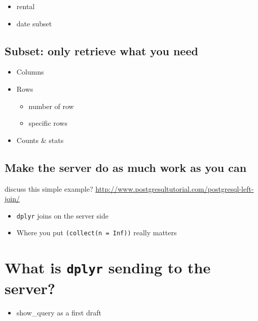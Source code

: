 \documentclass[]{book}
\providecommand{\tightlist}{%
  \setlength{\itemsep}{0pt}\setlength{\parskip}{0pt}}
\theoremstyle{definition}
\theoremstyle{definition}
\theoremstyle{definition}
\theoremstyle{remark}
\begin{document}
\begin{itemize}
\tightlist
\item
  rental
\item
  date subset
\end{itemize}

\hypertarget{subset-only-retrieve-what-you-need}{%
\subsection{Subset: only retrieve what you
need}\label{subset-only-retrieve-what-you-need}}

\begin{itemize}
\tightlist
\item
  Columns
\item
  Rows

  \begin{itemize}
  \tightlist
  \item
    number of row
  \item
    specific rows
  \end{itemize}
\item
  Counts \& stats
\end{itemize}

\hypertarget{make-the-server-do-as-much-work-as-you-can}{%
\subsection{Make the server do as much work as you
can}\label{make-the-server-do-as-much-work-as-you-can}}

discuss this simple example?
\url{http://www.postgresqltutorial.com/postgresql-left-join/}

\begin{itemize}
\tightlist
\item
  \texttt{dplyr} joins on the server side
\item
  Where you put \texttt{(collect(n\ =\ Inf))} really matters
\end{itemize}

\hypertarget{what-is-dplyr-sending-to-the-server}{%
\section{\texorpdfstring{What is \texttt{dplyr} sending to the
server?}{What is dplyr sending to the server?}}\label{what-is-dplyr-sending-to-the-server}}

\begin{itemize}
\tightlist
\item
  show\_query as a first draft
\end{itemize}
\end{document}
